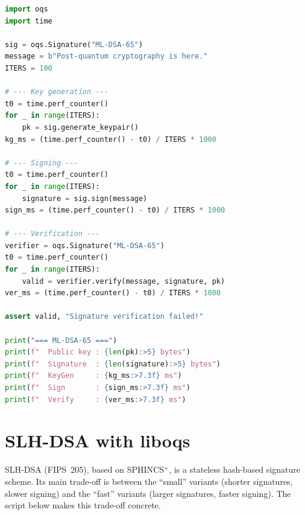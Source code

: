 \begin{lstlisting}[language=Python,caption={ML-DSA digital signatures with liboqs}]
import oqs
import time

sig = oqs.Signature("ML-DSA-65")
message = b"Post-quantum cryptography is here."
ITERS = 100

# --- Key generation ---
t0 = time.perf_counter()
for _ in range(ITERS):
    pk = sig.generate_keypair()
kg_ms = (time.perf_counter() - t0) / ITERS * 1000

# --- Signing ---
t0 = time.perf_counter()
for _ in range(ITERS):
    signature = sig.sign(message)
sign_ms = (time.perf_counter() - t0) / ITERS * 1000

# --- Verification ---
verifier = oqs.Signature("ML-DSA-65")
t0 = time.perf_counter()
for _ in range(ITERS):
    valid = verifier.verify(message, signature, pk)
ver_ms = (time.perf_counter() - t0) / ITERS * 1000

assert valid, "Signature verification failed!"

print("=== ML-DSA-65 ===")
print(f"  Public key : {len(pk):>5} bytes")
print(f"  Signature  : {len(signature):>5} bytes")
print(f"  KeyGen     : {kg_ms:>7.3f} ms")
print(f"  Sign       : {sign_ms:>7.3f} ms")
print(f"  Verify     : {ver_ms:>7.3f} ms")
\end{lstlisting}

\section{SLH-DSA with liboqs}
\label{app:slhdsa-impl}

SLH-DSA (FIPS~205), based on SPHINCS$^+$, is a stateless hash-based
signature scheme. Its main trade-off is between the ``small'' variants (shorter
signatures, slower signing) and the ``fast'' variants (larger signatures,
faster signing). The script below makes this trade-off concrete.

